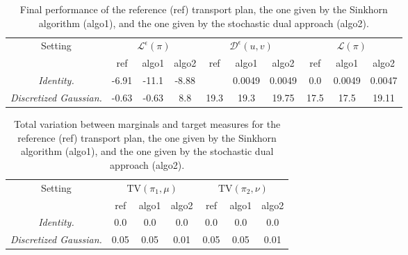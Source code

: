 \documentclass[a4paper,11pt]{article}
\newcommand{\1}{\mathbbm{1}}
\begin{document}
\setlength{\heavyrulewidth}{1.5pt} %
\setlength{\lightrulewidth}{0.8pt} %
\setlength{\cmidrulewidth}{0.5pt}  %
\setlength{\arrayrulewidth}{0.6pt}  %
\begin{table}[H]
    \centering
    \begin{tabular}{c|ccc|ccc|ccc}
        \toprule
        \multirow{2}{*}{Setting} & \multicolumn{3}{c}{$\mathcal{L}^{\epsilon}(\pi)$} & \multicolumn{3}{c}{$\mathcal{D}^{\epsilon}(u, v)$} & \multicolumn{3}{c}{$\mathcal{L}(\pi)$} \\
        \cmidrule(lr){2-4} \cmidrule(lr){5-7} \cmidrule(lr){8-10}
        & ref & algo1 & algo2 & ref & algo1 & algo2 & ref & algo1 & algo2 \\
        \midrule
        \emph{Identity.} & -6.91 & -11.1 & -8.88 & & 0.0049 & 0.0049 & 0.0 & 0.0049 & 0.0047 \\
        \emph{Discretized Gaussian.} & -0.63 & -0.63 & 8.8 & 19.3 & 19.3 & 19.75 & 17.5 & 17.5 & 19.11 \\
        \bottomrule
    \end{tabular}
    \caption{Final performance of the reference (ref) transport plan, the one given by the Sinkhorn algorithm (algo1), and the one given by the stochastic dual approach (algo2).}
    \label{tab:exp1}
\end{table}

\begin{table}[H]
    \centering
    \begin{tabular}{c|ccc|ccc}
        \toprule
        \multirow{2}{*}{Setting} & \multicolumn{3}{c}{$\mathrm{TV}(\pi_1, \mu)$} & \multicolumn{3}{c}{$\mathrm{TV}(\pi_2, \nu)$} \\
        \cmidrule(lr){2-4} \cmidrule(lr){5-7}
        & ref & algo1 & algo2 & ref & algo1 & algo2 \\
        \midrule
        \emph{Identity.} & 0.0 & 0.0 & 0.0 & 0.0 & 0.0 & 0.0 \\
        \emph{Discretized Gaussian.} & 0.05 & 0.05 & 0.01 & 0.05 & 0.05 & 0.01 \\
        \bottomrule
    \end{tabular}
    \caption{Total variation between marginals and target measures for the reference (ref) transport plan, the one given by the Sinkhorn algorithm (algo1), and the one given by the stochastic dual approach (algo2).}
    \label{tab:exp1_tv}
\end{table}
\end{document}
